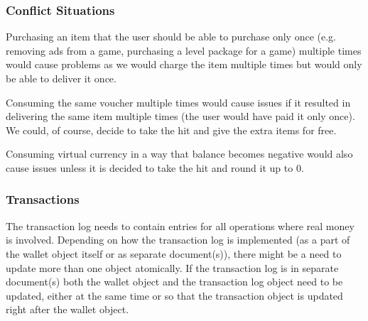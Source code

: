 \subsubsection{Conflict Situations}
Purchasing an item that the user should be able to purchase only once (e.g. removing ads from a game, purchasing a level package for a game) multiple times would cause problems as we would charge the item multiple times but would only be able to deliver it once.

Consuming the same voucher multiple times would cause issues if it resulted in delivering the same item multiple times (the user would have paid it only once). We could, of course, decide to take the hit and give the extra items for free.

Consuming virtual currency in a way that balance becomes negative would also cause issues unless it is decided to take the hit and round it up to 0.


\subsubsection{Transactions}
The transaction log needs to contain entries for all operations where real money is involved. Depending on how the transaction log is implemented (as a part of the wallet object itself or as separate document(s)), there might be a need to update more than one object atomically. If the transaction log is in separate document(s) both the wallet object and the transaction log object need to be updated, either at the same time or so that the transaction object is updated right after the wallet object.


